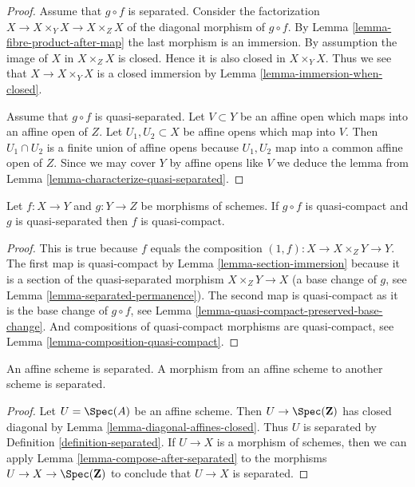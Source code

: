 \begin{proof}
Assume that $g \circ f$ is separated.
Consider the factorization $X \to X \times_Y X \to X \times_Z X$
of the diagonal morphism of $g \circ f$.
By Lemma \ref{lemma-fibre-product-after-map}
the last morphism is an immersion. By assumption the image
of $X$ in $X \times_Z X$ is closed. Hence it is also closed
in $X \times_Y X$. Thus we see that $X \to X \times_Y X$
is a closed immersion by Lemma \ref{lemma-immersion-when-closed}.

\medskip\noindent
Assume that $g \circ f$ is quasi-separated.
Let $V \subset Y$ be an affine open which maps into an affine
open of $Z$. Let $U_1, U_2 \subset X$ be affine opens which
map into $V$. Then $U_1 \cap U_2$ is a finite union of affine
opens because $U_1, U_2$ map into a common affine open
of $Z$. Since we may cover $Y$ by affine opens like $V$ we
deduce the lemma from Lemma \ref{lemma-characterize-quasi-separated}.
\end{proof}

\begin{lemma}
\label{lemma-quasi-compact-permanence}
Let $f : X \to Y$ and $g : Y \to Z$ be morphisms of schemes.
If $g \circ f$ is quasi-compact and $g$ is quasi-separated
then $f$ is quasi-compact.
\end{lemma}

\begin{proof}
This is true because $f$ equals the composition
$(1, f) : X \to X \times_Z Y \to Y$. The first map
is quasi-compact by Lemma \ref{lemma-section-immersion}
because it is a section of the quasi-separated morphism $X \times_Z Y \to X$
(a base change of $g$, see Lemma \ref{lemma-separated-permanence}).
The second map is quasi-compact as it
is the base change of $g \circ f$, see
Lemma \ref{lemma-quasi-compact-preserved-base-change}.
And compositions of quasi-compact
morphisms are quasi-compact, see Lemma \ref{lemma-composition-quasi-compact}.
\end{proof}

\begin{lemma}
\label{lemma-affine-separated}
An affine scheme is separated. A morphism from an affine scheme
to another scheme is separated.
\end{lemma}

\begin{proof}
Let $U = \Spec(A)$ be an affine scheme. Then $U \to \Spec(\mathbf{Z})$
has closed diagonal by Lemma \ref{lemma-diagonal-affines-closed}.
Thus $U$ is separated by Definition \ref{definition-separated}.
If $U \to X$ is a morphism of schemes, then we can apply
Lemma \ref{lemma-compose-after-separated}
to the morphisms $U \to X \to \Spec(\mathbf{Z})$ to conclude
that $U \to X$ is separated.
\end{proof}

